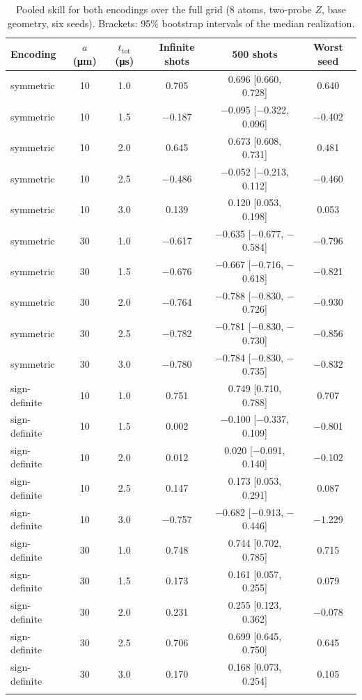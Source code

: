 \documentclass[pdflatex,sn-mathphys-num]{sn-jnl}
\begin{document}
\begin{table}[htb]
\caption{Pooled skill for both encodings over the full grid (8 atoms, two-probe $Z$, base geometry, six seeds). Brackets: 95\% bootstrap intervals of the median realization.}\label{tab:s7}
\begin{tabular}{@{}lccccc@{}}
\toprule
Encoding & $a$ (\si{\micro\meter}) & $t_{\mathrm{tot}}$ (\si{\micro\second}) & Infinite shots & 500 shots & Worst seed \\
\midrule
symmetric & 10 & 1.0 & 0.705 & 0.696 [0.660, 0.728] & 0.640 \\
symmetric & 10 & 1.5 & $-$0.187 & $-$0.095 [$-$0.322, 0.096] & $-$0.402 \\
symmetric & 10 & 2.0 & 0.645 & 0.673 [0.608, 0.731] & 0.481 \\
symmetric & 10 & 2.5 & $-$0.486 & $-$0.052 [$-$0.213, 0.112] & $-$0.460 \\
symmetric & 10 & 3.0 & 0.139 & 0.120 [0.053, 0.198] & 0.053 \\
symmetric & 30 & 1.0 & $-$0.617 & $-$0.635 [$-$0.677, $-$0.584] & $-$0.796 \\
symmetric & 30 & 1.5 & $-$0.676 & $-$0.667 [$-$0.716, $-$0.618] & $-$0.821 \\
symmetric & 30 & 2.0 & $-$0.764 & $-$0.788 [$-$0.830, $-$0.726] & $-$0.930 \\
symmetric & 30 & 2.5 & $-$0.782 & $-$0.781 [$-$0.830, $-$0.730] & $-$0.856 \\
symmetric & 30 & 3.0 & $-$0.780 & $-$0.784 [$-$0.830, $-$0.735] & $-$0.832 \\
sign-definite & 10 & 1.0 & 0.751 & 0.749 [0.710, 0.788] & 0.707 \\
sign-definite & 10 & 1.5 & 0.002 & $-$0.100 [$-$0.337, 0.109] & $-$0.801 \\
sign-definite & 10 & 2.0 & 0.012 & 0.020 [$-$0.091, 0.140] & $-$0.102 \\
sign-definite & 10 & 2.5 & 0.147 & 0.173 [0.053, 0.291] & 0.087 \\
sign-definite & 10 & 3.0 & $-$0.757 & $-$0.682 [$-$0.913, $-$0.446] & $-$1.229 \\
sign-definite & 30 & 1.0 & 0.748 & 0.744 [0.702, 0.785] & 0.715 \\
sign-definite & 30 & 1.5 & 0.173 & 0.161 [0.057, 0.255] & 0.079 \\
sign-definite & 30 & 2.0 & 0.231 & 0.255 [0.123, 0.362] & $-$0.078 \\
sign-definite & 30 & 2.5 & 0.706 & 0.699 [0.645, 0.750] & 0.645 \\
sign-definite & 30 & 3.0 & 0.170 & 0.168 [0.073, 0.254] & 0.105 \\
\botrule
\end{tabular}
\end{table}
\end{document}
